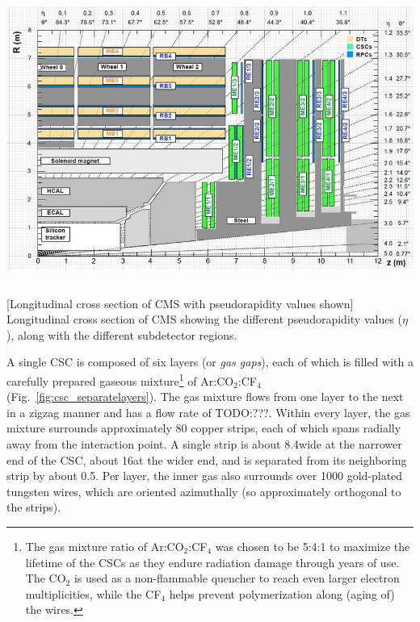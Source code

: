 \begin{multiFigure}
    \centering
    \includegraphics[width=15cm,height=10cm,keepaspectratio]{figures/cms/cms_longitudinal_view.png}
        [Longitudinal cross section of CMS with pseudorapidity values shown]
        {Longitudinal cross section of CMS showing the different pseudorapidity values ($\eta$), along with the different subdetector regions.}
    \label{fig:cms_long_view_subdetectors}
\end{multiFigure}
A single CSC is composed of six layers (or \emph{gas gaps}), each of which is filled with a carefully prepared gaseous mixture\footnote{
    The gas mixture ratio of Ar:CO$_{2}$:CF$_{4}$ was chosen to be 5:4:1 to maximize the lifetime of the CSCs as they endure radiation damage through years of use.
    The CO$_{2}$ is used as a non-flammable quencher to reach even larger electron multiplicities, while the CF$_{4}$ helps prevent polymerization along (aging of) the wires.
    }
of Ar:CO$_{2}$:CF$_{4}$ (Fig.~\ref{fig:csc_separatelayers}).
The gas mixture flows from one layer to the next in a zigzag manner and has a flow rate of TODO:???.
Within every layer, the gas mixture surrounds approximately 80 copper strips, each of which spans radially away from the interaction point.
A single strip is about 8.4\mm wide at the narrower end of the CSC, about 16\mm at the wider end, and is separated from its neighboring strip by about 0.5\mm.
Per layer, the inner gas also surrounds over 1000 gold-plated tungsten wires, which are oriented azimuthally (so approximately orthogonal to the strips).
